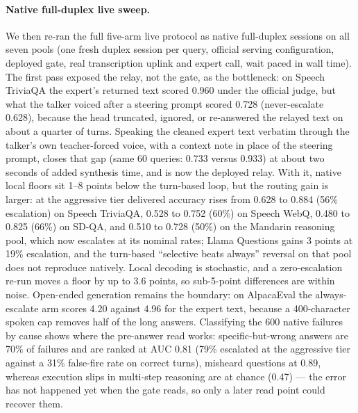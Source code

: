 \paragraph{Native full-duplex live sweep.}
We then re-ran the full five-arm live protocol as native full-duplex
sessions on all seven pools (one fresh duplex session per query,
official serving configuration, deployed gate, real transcription
uplink and expert call, wait paced in wall time). The first pass
exposed the relay, not the gate, as the bottleneck: on Speech
TriviaQA the expert's returned text scored 0.960 under the official
judge, but what the talker voiced after a steering prompt scored
0.728 (never-escalate 0.628), because the head truncated, ignored, or
re-answered the relayed text on about a quarter of turns. Speaking
the cleaned expert text verbatim through the talker's own
teacher-forced voice, with a context note in place of the steering
prompt, closes that gap (same 60 queries: 0.733 versus 0.933) at
about two seconds of added synthesis time, and is now the deployed
relay. With it, native local floors sit 1--8 points below the
turn-based loop, but the routing gain is larger: at the aggressive
tier delivered accuracy rises from 0.628 to 0.884 (56\% escalation)
on Speech TriviaQA, 0.528 to 0.752 (60\%) on Speech WebQ, 0.480 to
0.825 (66\%) on SD-QA, and 0.510 to 0.728 (50\%) on the Mandarin
reasoning pool, which now escalates at its nominal rates; Llama
Questions gains 3 points at 19\% escalation, and the turn-based
``selective beats always'' reversal on that pool does not reproduce
natively. Local decoding is stochastic, and a zero-escalation re-run
moves a floor by up to 3.6 points, so sub-5-point differences are
within noise. Open-ended generation remains the boundary: on
AlpacaEval the always-escalate arm scores 4.20 against 4.96 for the
expert text, because a 400-character spoken cap removes half of the
long answers. Classifying the 600 native failures by cause shows where
the pre-answer read works: specific-but-wrong answers are 70\% of
failures and are ranked at AUC 0.81 (79\% escalated at the aggressive
tier against a 31\% false-fire rate on correct turns), misheard
questions at 0.89, whereas execution slips in multi-step reasoning are
at chance (0.47) --- the error has not happened yet when the gate
reads, so only a later read point could recover them.

